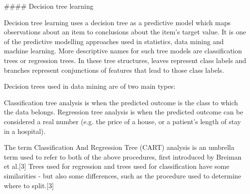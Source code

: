 



#### Decision tree learning




Decision tree learning uses a decision tree as a predictive model which maps observations about an item to conclusions about the item's target value. It is one of the predictive modelling approaches used in statistics, data mining and machine learning. More descriptive names for such tree models are classification trees or regression trees. In these tree structures, leaves represent class labels 
and branches represent conjunctions of features that lead to those class labels.


Decision trees used in data mining are of two main types:

Classification tree analysis is when the predicted outcome is the class to which the data belongs.
Regression tree analysis is when the predicted outcome can be considered a real number (e.g. the price of a house, or a patient’s length of stay in a hospital).


The term Classification And Regression Tree (CART) analysis is an umbrella term used to refer to both of the above procedures, first introduced by Breiman et al.[3] Trees used for regression and trees used for classification have some similarities - but also some differences, such as the procedure used to determine where to split.[3]

